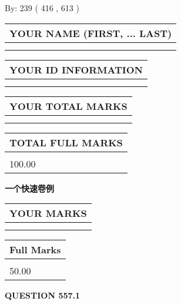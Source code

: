 \documentclass{ctexart}
\begin{document}
   
\hspace{1.0in} By: 
 239 ( 416 ,  613 )
   
   
   
   
\newpage 
\setcounter{page}{ 
   557001 } 
   
   
   
   
\noindent\begin{tabular}{|l|}
\hline
YOUR NAME (FIRST, ... LAST)  \\
\hline
 \\ 
 \\ 
\hline
\end{tabular}
\hspace{0.05in} \begin{tabular}{|l|}
\hline
 YOUR   ID   INFORMATION  \\
\hline
 \\ 
 \\ 
\hline
\end{tabular}
   
   
\vspace{0.2in}\noindent\begin{tabular}{|l|}
\hline
YOUR TOTAL MARKS  \\
\hline
 \\ 
 \\ 
\hline
\end{tabular}
\hspace{0.05in} \begin{tabular}{|l|}
\hline
TOTAL FULL MARKS  \\
\hline
 \\ 
100.00 \\
\hline
\end{tabular}
   
   
 \vspace{0.2in}
{\LARGE {\textbf{ 一个快速卷例}}}
   
   
  
\vspace{0.2in}
  
\noindent\begin{tabular}{|l|}
\hline
 YOUR MARKS  \\
\hline
 \\ 
 \\ 
\hline
\end{tabular}
\hspace{0.05in} \begin{tabular}{|l|}
\hline
 Full Marks  \\
\hline
 \\ 
50.00 \\
\hline
\end{tabular}
{\textbf{\Large{QUESTION
557.1 
}}}
  
\end{document}
